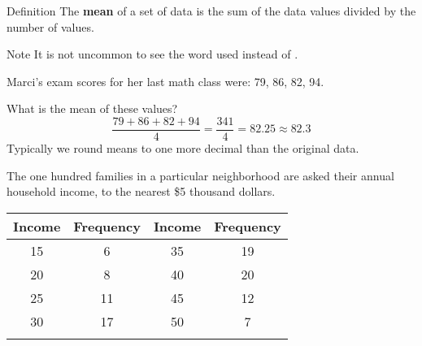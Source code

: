 \documentclass{beamer}
\begin{document}
\begin{frame}
\begin{example}
{
}
\vspace{-5mm}
\end{example}
\end{frame}

\begin{frame}
\begin{block}{Definition}
The \textbf{mean} of a set of data is the sum of the data values divided by the number of values.
\end{block}\pause

\begin{block}{Note}
It is not uncommon to see the word  used instead of .
\end{block}\pause

\begin{example}
Marci's exam scores for her last math class were: 79, 86, 82, 94. 

What is the mean of these values?\pause
\begin{equation*}
\dfrac{79+86+82+94}{4}=\dfrac{341}{4}=82.25\approx 82.3
\end{equation*}
Typically we round means to one more decimal than the original data.
\end{example}
\end{frame}

\begin{frame}
\begin{example}
The one hundred families in a particular neighborhood are asked their annual household income, to the nearest \$5 thousand dollars. 
\begin{center}
\begin{tabular}{|c|c||c|c|}
\hline
\textbf{Income} & \textbf{Frequency} & \textbf{Income} & \textbf{Frequency} \\\hline
15 &6 & 35 &19\\\hline
20 &8 & 40 &20\\\hline
25 &11 & 45 &12\\\hline
30 &17 & 50 &7\\\hline
\end{t
\end{tabular}
\end{center}
\end{example}
\end{frame}
\end{document}
